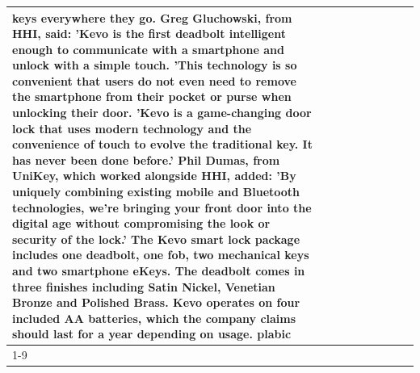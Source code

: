 \begin{table}[H]
\begin{tabular}{lllrlllll}
keys everywhere they go. Greg Gluchowski, from HHI, said: 'Kevo is the first deadbolt intelligent enough to communicate with a smartphone and unlock with a simple touch. 'This technology is so convenient that users do not even need to remove the smartphone from their pocket or purse when unlocking their door. 'Kevo is a game-changing door lock that uses modern technology and the convenience of touch to evolve the traditional key. It has never been done before.' Phil Dumas, from UniKey, which worked alongside HHI, added: 'By uniquely combining existing mobile and Bluetooth technologies, we’re bringing your front door into the digital age without compromising the look or security of the lock.' The Kevo smart lock package includes one deadbolt, one fob, two mechanical keys and two smartphone eKeys. The deadbolt comes in three finishes including Satin Nickel, Venetian Bronze and Polished Brass. Kevo operates on four included AA batteries, which the company claims should last for a year depending on usage. plabic \\
\cline{1-9}

\end{tabular}
\end{table}
